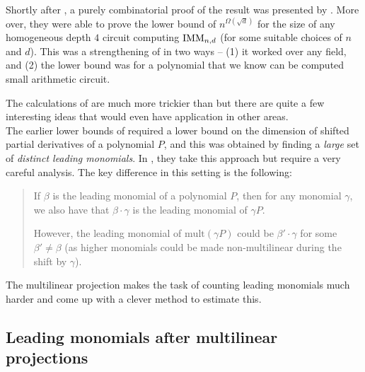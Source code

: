 Shortly after \cite{KLSS}, a purely combinatorial proof of the result was presented by \cite{KS14}. More over, they were able to prove the lower bound of $n^{\Omega(\sqrt{d})}$ for the size of any homogeneous depth $4$ circuit computing $\mathrm{IMM}_{n,d}$ (for some suitable choices of $n$ and $d$). This was a strengthening of \cite{KLSS} in two ways -- (1) it worked over any field, and (2) the lower bound was for a polynomial that we know can be computed small arithmetic circuit. 

The calculations of \cite{KS14} are much more trickier than \cite{KLSS} but there are quite a few interesting ideas that would even have application in other areas. \\

The earlier lower bounds of \cite{gkks13,KSS13,FLMS13} required a lower bound on the dimension of shifted partial derivatives of a polynomial $P$, and this was obtained by finding a \emph{large} set of \emph{distinct leading monomials}. In \cite{KS14}, they take this approach but require a very careful analysis. The key difference in this setting is the following: 

\begin{quote}
  If $\beta$ is the leading monomial of a polynomial $P$, then for any monomial $\gamma$, we also have that $\beta \cdot \gamma$ is the leading monomial of $\gamma P$. 

  However, the leading monomial of $\mathrm{mult}(\gamma P)$ could be $\beta' \cdot \gamma$ for some $\beta' \neq \beta$ (as higher monomials could be made non-multilinear during the shift by $\gamma$). 
\end{quote}

The multilinear projection makes the task of counting leading monomials much harder and \cite{KS14} come up with a clever method to estimate this. 

\subsection*{Leading monomials after multilinear projections}

